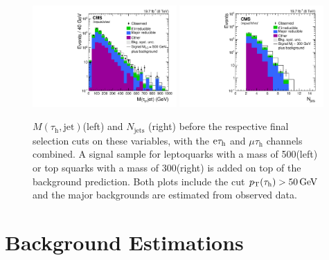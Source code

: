 \documentclass[12pt]{thesis}  %
\newcommand{\tauh}{\ensuremath{\tau_{\text{h}}}\xspace}
\newcommand{\Pe}{\ensuremath{\cmsSymbolFace{e}}\xspace}
\newcommand{\mutau}{\ensuremath{\mu\tauh}\xspace}
\newcommand{\etau}{\ensuremath{\Pe\tauh}\xspace}
\def\MassTJ{\ensuremath{M(\tauh,\text{jet})}\xspace}
\begin{document}
\begin{figure}[hbt]
  \begin{center}
    \includegraphics[width=0.49\textwidth]{figures/final/mtj_lq_log.pdf}
    \includegraphics[width=0.49\textwidth]{figures/final/njets_lqd321_log.pdf}
    \caption{\MassTJ (left) and $N_{\text{jets}}$ (right) before the respective final selection cuts on these variables, with the \etau and \mutau channels combined. A signal sample for leptoquarks with a mass of 500\GeV (left) or top squarks with a mass of 300\GeV (right) is added on top of the background prediction. Both plots include the cut $\pt(\tauh)>50\GeV$ and the major backgrounds are estimated from observed data.}
    \label{fig:finalcutscombined}
  \end{center}
\end{figure}

\section{Background Estimations
\label{sec:background}}
\end{document}
